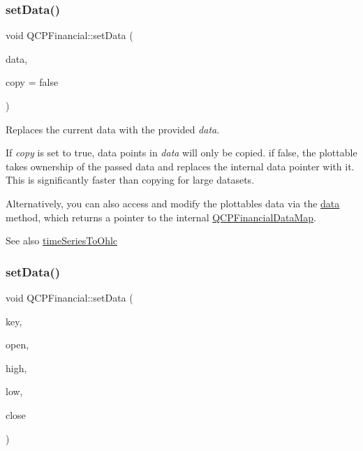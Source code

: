 \subsubsection{\texorpdfstring{set\+Data()}{setData()}\hspace{0.1cm}{\footnotesize\ttfamily [1/2]}}
{\footnotesize\ttfamily void Q\+C\+P\+Financial\+::set\+Data (\begin{DoxyParamCaption}\item[{\hyperlink{qcustomplot_8h_a745c09823fae0974b50beca9bc3b3d7d}{Q\+C\+P\+Financial\+Data\+Map} $\ast$}]{data,  }\item[{bool}]{copy = {\ttfamily false} }\end{DoxyParamCaption})}

Replaces the current data with the provided {\itshape data}.

If {\itshape copy} is set to true, data points in {\itshape data} will only be copied. if false, the plottable takes ownership of the passed data and replaces the internal data pointer with it. This is significantly faster than copying for large datasets.

Alternatively, you can also access and modify the plottable\textquotesingle{}s data via the \hyperlink{class_q_c_p_financial_a528c81578e4f25999a9169127763cfd4}{data} method, which returns a pointer to the internal \hyperlink{qcustomplot_8h_a745c09823fae0974b50beca9bc3b3d7d}{Q\+C\+P\+Financial\+Data\+Map}.

\begin{DoxySeeAlso}{See also}
\hyperlink{class_q_c_p_financial_a0c3453d1c03e320950fdd2df54e3ebc8}{time\+Series\+To\+Ohlc} 
\end{DoxySeeAlso}
\hypertarget{class_q_c_p_financial_a886881339d6447432af55adaad748c3c}{}\label{class_q_c_p_financial_a886881339d6447432af55adaad748c3c} 
\subsubsection{\texorpdfstring{set\+Data()}{setData()}\hspace{0.1cm}{\footnotesize\ttfamily [2/2]}}
{\footnotesize\ttfamily void Q\+C\+P\+Financial\+::set\+Data (\begin{DoxyParamCaption}\item[{const Q\+Vector$<$ double $>$ \&}]{key,  }\item[{const Q\+Vector$<$ double $>$ \&}]{open,  }\item[{const Q\+Vector$<$ double $>$ \&}]{high,  }\item[{const Q\+Vector$<$ double $>$ \&}]{low,  }\item[{const Q\+Vector$<$ double $>$ \&}]{close }\end{DoxyParamCaption})}

